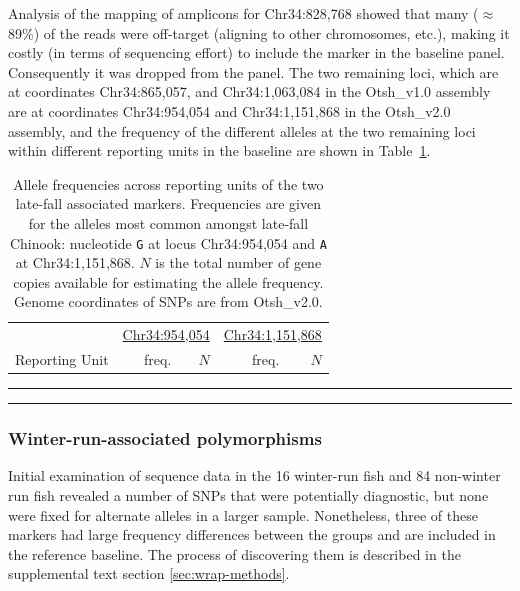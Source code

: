 Analysis of the mapping of amplicons for Chr34:828,768
showed that many ($\approx$89\%) of the reads were off-target (aligning to other chromosomes,
etc.), making it costly (in terms of sequencing effort) to include the marker in the baseline panel.
Consequently it was dropped from the panel.  The two remaining loci, which are at coordinates
Chr34:865,057, and Chr34:1,063,084 in the Otsh\_v1.0 assembly are at coordinates
Chr34:954,054 and  Chr34:1,151,868 in the Otsh\_v2.0 assembly, and
the frequency of the different alleles at the two remaining loci
within different reporting units in the baseline are shown in Table~\ref{tab:lfar-freqs}.
\begin{table}
\caption{\footnotesize Allele frequencies across reporting units of the two late-fall associated
markers.  Frequencies are given for the alleles most common amongst late-fall Chinook: nucleotide
{\tt G} at locus Chr34:954,054 and {\tt A} at Chr34:1,151,868.  $N$ is the total number of gene
copies available for estimating the allele frequency. Genome coordinates of SNPs are from Otsh\_v2.0.}
\label{tab:lfar-freqs}
{\footnotesize
\begin{tabular*}{0.48\textwidth}{@{\extracolsep{\fill}} lrrrr}
\hline\hline
& \multicolumn{2}{c}{\underline{Chr34:954,054}} & \multicolumn{2}{c}{\underline{Chr34:1,151,868}} \\
Reporting Unit & freq. & $N$ & freq. & $N$ \\ \hline

\end{tabular*}
}
\par\vspace*{-2.2ex}\noindent\rule{0.48\textwidth}{0.5pt}
\par\vspace*{-2.4ex}\noindent\rule{0.48\textwidth}{0.5pt}
\end{table}

\subsubsection*{Winter-run-associated polymorphisms}

Initial examination of sequence data 
in the 16 winter-run fish and 84 non-winter run fish revealed
a number of SNPs that were potentially diagnostic, but none were fixed for alternate alleles 
in a larger sample.
Nonetheless, three of these markers had large frequency differences
between the groups and are included in the reference baseline.  The process of 
discovering them is described in the supplemental text section \ref{sec:wrap-methods}.

